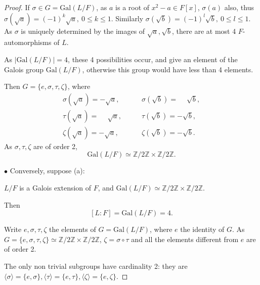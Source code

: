 \documentclass[11pt,a4paper]{article}
\newcommand{\Z}{\mathbb{Z}}
\newcommand{\Gal}{\mathrm{Gal}}
\begin{document}
\begin{proof}
If $\sigma \in G = \Gal(L/F)$, as $a$ is a root of $x^2 -a \in F[x]$, $\sigma(a)$ also, thus $\sigma(\sqrt{a}) =(-1)^k \sqrt{a},\  0 \leq k \leq 1$. Similarly $\sigma(\sqrt{b}) =(-1)^l \sqrt{b}, \ 0 \leq l \leq 1$. As $\sigma$ is uniquely determined by the images of $\sqrt{a}, \sqrt{b}$, there are at most 4 $F$-automorphisms of $L$.

As $\vert \Gal(L/F) \vert = 4$,  these 4 possibilities occur, and give an element of the Galois group $\Gal(L/F)$, otherwise this group would have less than 4 elements. 

Then
$G = \{e, \sigma, \tau, \zeta\}$, where 
\begin{align*}
\sigma(\sqrt{a}) = -\sqrt{a}, \qquad&\sigma(\sqrt{b}) = \phantom{-}\sqrt{b},\\
\tau(\sqrt{a}) = \phantom{-}\sqrt{a}, \qquad&\tau(\sqrt{b}) = -\sqrt{b},\\
\zeta(\sqrt{a}) = -\sqrt{a}, \qquad&\zeta(\sqrt{b}) = -\sqrt{b}.
\end{align*}
As $\sigma, \tau, \zeta$ are of order 2, 
$$\Gal(L/F) \simeq \Z/2\Z \times \Z/2\Z.$$

$\bullet$ Conversely, suppose (a): 
\begin{center}
$L/F$ is a Galois extension of $F$,  and $\Gal(L/F) \simeq \Z/2\Z \times \Z/2\Z$.
\end{center}
Then $$[L:F] = \Gal(L/F) = 4.$$

Write $e,\sigma, \tau,\zeta$ the elements of $G =\Gal(L/F) $, where $e$ the identity of $G$. As $G  = \{e,\sigma,\tau, \zeta\} \simeq \Z/2\Z \times \Z/2\Z$, $\zeta = \sigma \circ \tau$ and all the elements different from $e$ are of order 2.

The only non trivial subgroups have cardinality 2: they are $\langle \sigma \rangle = \{e,\sigma\}, \langle \tau \rangle = \{e,\tau\},\langle \zeta \rangle = \{e,\zeta\}$.

\bigskip



\end{proof}
\end{document}
